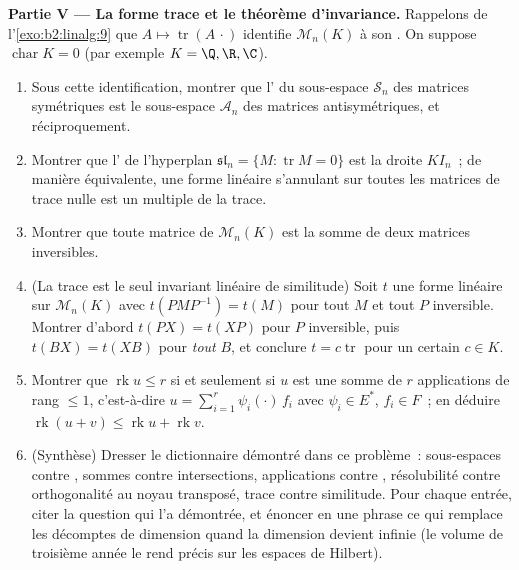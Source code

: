 \begin{problem}
\medskip
\noindent\textbf{Partie V --- La forme trace et le théorème
d'invariance.} Rappelons de l'\cref{exo:b2:linalg:9} que $A \mapsto
\operatorname{tr}(A\,\cdot)$ identifie $\mathcal{M}_n(K)$ à
son . On suppose $\operatorname{char} K = 0$ (par exemple $K = \Q, \R,
\C$).
\begin{enumerate}[resume]
  \item Sous cette identification, montrer que l' du
        sous-espace $\mathcal{S}_n$ des matrices symétriques est le
        sous-espace $\mathcal{A}_n$ des matrices antisymétriques, et
        réciproquement.
  \item Montrer que l' de l'hyperplan
        $\mathfrak{sl}_n = \{M : \operatorname{tr} M = 0\}$ est
        la droite $K I_n$~; de manière équivalente, une forme linéaire
        s'annulant sur toutes les matrices de trace nulle est un
        multiple de la trace.
  \item Montrer que toute matrice de $\mathcal{M}_n(K)$ est la somme
        de deux matrices inversibles.
  \item (La trace est le seul invariant linéaire de similitude) Soit
        $t$ une forme linéaire sur $\mathcal{M}_n(K)$ avec
        $t(PMP^{-1}) = t(M)$ pour tout $M$ et tout $P$ inversible.
        Montrer d'abord $t(PX) = t(XP)$ pour $P$ inversible, puis
        $t(BX) = t(XB)$ pour \emph{tout} $B$, et conclure $t = c
        \operatorname{tr}$ pour un certain $c \in K$.
  \item Montrer que $\operatorname{rk} u \leq r$ si et seulement si $u$
        est une somme de $r$ applications de rang $\leq 1$, c'est-à-dire $u =
        \sum_{i=1}^{r} \psi_i(\cdot)\,f_i$ avec $\psi_i \in E^*$,
        $f_i \in F$~; en déduire $\operatorname{rk}(u + v) \leq
        \operatorname{rk} u + \operatorname{rk} v$.
  \item (Synthèse) Dresser le dictionnaire démontré dans ce
        problème~: sous-espaces contre , sommes contre
        intersections, applications contre , résolubilité contre
        orthogonalité au noyau transposé, trace contre
        similitude. Pour chaque entrée, citer la question qui l'a
        démontrée, et énoncer en une phrase ce qui remplace les décomptes
        de dimension quand la dimension devient infinie (le volume de
        troisième année le rend précis sur les espaces de Hilbert).
\end{enumerate}
\end{problem}
